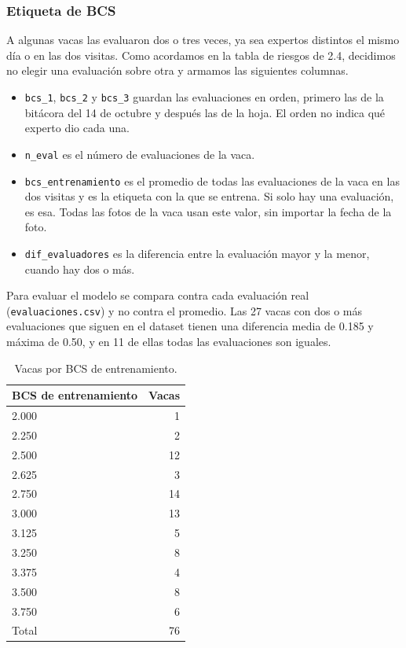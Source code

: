 \subsubsection*{Etiqueta de BCS}

A algunas vacas las evaluaron dos o tres veces, ya sea expertos distintos el mismo día o en las dos visitas. Como acordamos en la tabla de riesgos de 2.4, decidimos no elegir una evaluación sobre otra y armamos las siguientes columnas.

\begin{itemize}
  \item \texttt{bcs\_1}, \texttt{bcs\_2} y \texttt{bcs\_3} guardan las evaluaciones en orden, primero las de la bitácora del 14 de octubre y después las de la hoja. El orden no indica qué experto dio cada una.
  \item \texttt{n\_eval} es el número de evaluaciones de la vaca.
  \item \texttt{bcs\_entrenamiento} es el promedio de todas las evaluaciones de la vaca en las dos visitas y es la etiqueta con la que se entrena. Si solo hay una evaluación, es esa. Todas las fotos de la vaca usan este valor, sin importar la fecha de la foto.
  \item \texttt{dif\_evaluadores} es la diferencia entre la evaluación mayor y la menor, cuando hay dos o más.
\end{itemize}

Para evaluar el modelo se compara contra cada evaluación real (\nolinkurl{evaluaciones.csv}) y no contra el promedio. Las 27 vacas con dos o más evaluaciones que siguen en el dataset tienen una diferencia media de 0.185 y máxima de 0.50, y en 11 de ellas todas las evaluaciones son iguales.

\begin{table}[H]
  \centering
  \caption{Vacas por BCS de entrenamiento.}
  \label{tab:bcs-entrenamiento}
  \begin{tabular}{lr}
    \toprule
    BCS de entrenamiento & Vacas \\
    \midrule
    2.000 & 1 \\
    2.250 & 2 \\
    2.500 & 12 \\
    2.625 & 3 \\
    2.750 & 14 \\
    3.000 & 13 \\
    3.125 & 5 \\
    3.250 & 8 \\
    3.375 & 4 \\
    3.500 & 8 \\
    3.750 & 6 \\
    \midrule
    Total & 76 \\
    \bottomrule
  \end{tabular}
\end{table}

